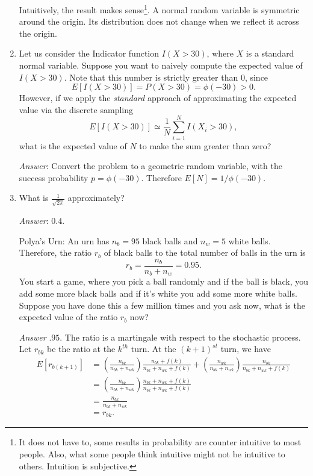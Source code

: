 \documentclass{amsart}
\theoremstyle{plain}
\numberwithin{equation}{section}
\begin{document}
\begin{enumerate}
Intuitively, the result makes sense\footnote{It does not have to,
some results in probability are counter intuitive to most people. 
Also, what some people think intuitive might not be intuitive to 
others. Intuition is subjective.}. A normal 
random variable is symmetric around the origin. Its 
distribution does not change when we reflect it across the origin.

\item Let us consider the Indicator function $I(X>30)$, where
$X$ is a standard normal variable. 
Suppose you want to naively compute the expected value of 
$I(X>30)$. Note that this number is strictly greater than
$0$, since
\begin{equation*}
E[I(X>30)] = P(X>30) = \phi( -30 ) > 0.
\end{equation*}
However, if we apply the \emph{standard} approach 
of approximating the expected value via the 
discrete sampling
\begin{equation*}
E[I(X>30)] \simeq \frac{1}{N}\sum_{i=1}^{N} I(X_i>30), 
\end{equation*}
what is the expected value of $N$ to make the 
sum greater than zero?

\emph{Answer}: Convert the problem to 
a geometric random variable, with the 
success probability $p = \phi(-30)$. 
Therefore $E[N] = 1/\phi(-30)$. 

\item What is $\frac{1}{\sqrt{2\pi}}$ approximately?

\emph{Answer}: $0.4$.

Polya's Urn: An urn has $n_b=95$ black balls
and $n_w=5$ white balls. Therefore, the ratio 
$r_b$ of black balls to the total number of 
balls in the urn is 
\begin{equation}
r_b = \frac{n_b}{n_b + n_w} = 0.95.
\end{equation}
You start a game, where 
you pick a ball randomly and if the ball
is black, you 
add some more black balls and if it's white you 
add some more white balls. Suppose you have 
done this a few million times and you ask 
now, what is the expected value of the 
ratio $r_b$ now?

\emph{Answer} $.95$. The ratio is a martingale with 
respect to the stochastic process.
Let $r_{bk}$ be the ratio at the $k^{th}$ 
turn. At the $(k+1)^{st}$ turn, we have 
\begin{align}
E[ r_{b(k+1)} ] &= 
\left( \frac{n_{bk}}{n_{bk} + n_{wk}} \right)
\frac{n_{bk} + f(k)}{n_{bk} + n_{wk} + f(k)} +
\left( \frac{n_{wk}}{n_{bk} + n_{wk}} \right)
\frac{n_{bk}}{n_{bk} + n_{wk} + f(k)}\\
&= \left( \frac{n_{bk}}{n_{bk} + n_{wk}} \right)
\frac{n_{bk} + n_{wk} + f(k) }{n_{bk} + n_{wk} + f(k)}\\
&= \frac{n_{bk}}{n_{bk} + n_{wk}}\\
&= r_{bk}.
\end{align}


\end{enumerate}
\end{document}
